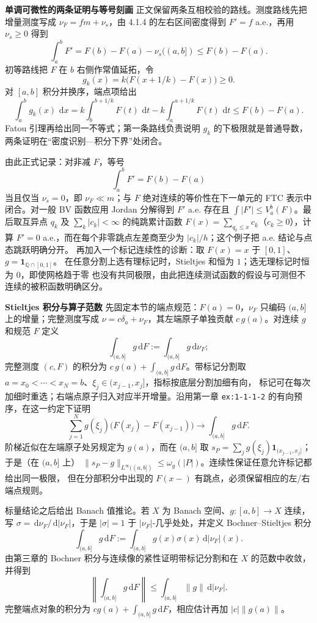 \documentclass[11pt,a4paper]{ctexart}
\newcommand{\dd}{\,\mathrm d}
\newcommand{\planitem}[1]{\par\smallskip\noindent\textcolor{deepblue}{\textbf{#1}}\quad}
\begin{document}
\planitem{单调可微性的两条证明与等号刻画}
正文保留两条互相校验的路线。测度路线先把增量测度写成
$\nu_F=fm+\nu_s$，由 4.1.4 的左右区间密度得到 $F'=f$ a.e.，再用
$\nu_s\ge0$ 得到
\[
 \int_a^bF'=F(b)-F(a)-\nu_s((a,b])\le F(b)-F(a).
\]
初等路线把 $F$ 在 $b$ 右侧作常值延拓，令
\[
 g_k(x)=k\bigl(F(x+1/k)-F(x)\bigr)\ge0.
\]
对 $[a,b]$ 积分并换序，端点项给出
\[
 \int_a^bg_k(x)\,\dd x
 =k\int_b^{b+1/k}F(t)\,\dd t-k\int_a^{a+1/k}F(t)\,\dd t
 \le F(b)-F(a).
\]
Fatou 引理再给出同一不等式；第一条路线负责说明 $g_k$ 的下极限就是普通导数，
两条证明在“密度识别—积分下界”处闭合。

由此正式记录：对非减 $F$，等号
\[
 \int_a^bF'=F(b)-F(a)
\]
当且仅当 $\nu_s=0$，即 $\nu_F\ll m$；与 $F$ 绝对连续的等价性在下一单元的
FTC 表示中闭合。对一般 BV 函数应用 Jordan 分解得到
$F'$ a.e. 存在且 $\int|F'|\le V_a^b(F)$。最后取互异点 $q_k$ 及
$\sum_k|c_k|<\infty$ 的纯跳累计函数
$F(x)=\sum_{q_k\le x}c_k$（$c_k\ge0$），计算 $F'=0$ a.e.，而在每个非零跳点左差商至少为
$|c_k|/h$；这个例子把 a.e. 结论与点态跳跃明确分开。
再加入一个标记连续性的诊断：取 $F(x)=x$ 于 $[0,1]$、$g=\mathbf1_{\mathbb Q\cap[0,1]}$。
在任意分割上选有理标记时，Stieltjes 和恒为 $1$；选无理标记时恒为 $0$，即使网格趋于零
也没有共同极限，由此把连续测试函数的假设与可测但不连续的被积函数明确区分。

\planitem{Stieltjes 积分与算子范数}
先固定本节的端点规范：$F(a)=0$，$\nu_F$ 只编码 $(a,b]$ 上的增量；完整测度写成
$\nu=c\delta_a+\nu_F$，其左端原子单独贡献 $c\,g(a)$。对连续 $g$ 和规范 $F$ 定义
\[
\int_{(a,b]}g\dd F:=\int_{(a,b]}g\dd\nu_F;
\]
完整测度 $(c,F)$ 的积分为 $c\,g(a)+\int_{(a,b]}g\dd F$。带标记分割取
$a=x_0<\cdots<x_N=b$、$\xi_j\in(x_{j-1},x_j]$，指标按底层分割加细有向，
标记可在每次加细时重选；右端点原子归入对应半开增量。沿用第一章
\texttt{ex:1-1-1-2} 的有向预序，在这一约定下证明
\[
\sum_{j=1}^Ng(\xi_j)\bigl(F(x_j)-F(x_{j-1})\bigr)
\longrightarrow \int_{(a,b]}g\dd F.
\]
阶梯近似在左端原子处另规定为 $g(a)$，而在 $(a,b]$ 取
$s_P=\sum_jg(\xi_j)\mathbf1_{(x_{j-1},x_j]}$；于是（在 $(a,b]$ 上）
$\|s_P-g\|_{L^\infty((a,b])}\le\omega_g(|P|)$。连续性保证任意允许标记都给出同一极限，
但在分部积分中出现的 $F(x-)$ 有跳点，必须保留相应的左/右端点规则。

标量结论之后给出 Banach 值推论。若 $X$ 为 Banach 空间、$g:[a,b]\to X$ 连续，写
$\sigma=\dd\nu_F/\dd|\nu_F|$，于是 $|\sigma|=1$ 于 $|\nu_F|$-几乎处处，并定义 Bochner--Stieltjes 积分
\[
\int_{(a,b]}g\dd F
:=\int_{(a,b]}g(x)\sigma(x)\dd|\nu_F|(x).
\]
由第三章的 Bochner 积分与连续像的紧性证明带标记分割和在 $X$ 的范数中收敛，并得到
\[
\left\|\int_{(a,b]}g\dd F\right\|
\le\int_{(a,b]}\|g\|\dd|\nu_F|.
\]
完整端点对象的积分为 $cg(a)+\int_{(a,b]}g\dd F$，相应估计再加
$|c|\|g(a)\|$。
\end{document}
